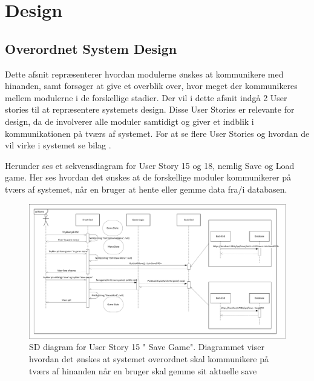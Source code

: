 \section{Design}

\subsection{Overordnet System Design}
\noindent Dette afsnit repræsenterer hvordan modulerne ønskes at kommunikere med hinanden, samt forsøger at give et overblik over, hvor meget der kommunikeres mellem modulerne i de forskellige stadier. Der vil i dette afsnit indgå 2 User stories til at repræsentere systemets design. Disse User Stories er relevante for design, da de involverer alle moduler samtidigt og giver et indblik i kommunikationen på tværs af systemet. For at se flere User Stories og hvordan de vil virke i systemet se bilag \parencite[][Section 8]{TekniskBilag}.

\noindent Herunder ses et sekvensdiagram for User Story 15 og 18, nemlig Save og Load game. Her ses hvordan det ønskes at de forskellige moduler kommunikerer på tværs af systemet, når en bruger at hente eller gemme data fra/i databasen.
\begin{figure}[H]
\centering
\includegraphics[width = \textwidth]{02-Body/Images/Arkitektur-SDSaveGame}
\caption{SD diagram for User Story 15 " Save Game". Diagrammet viser hvordan det ønskes at systemet overordnet skal kommunikere på tværs af hinanden når en bruger skal gemme sit aktuelle save}
\label{fig:Arkitektur-SD-SaveGame}
\end{figure}

